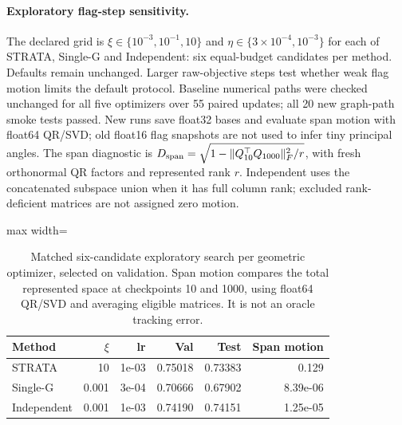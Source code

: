 \paragraph{Exploratory flag-step sensitivity.} The declared grid is $\xi\in\{10^{-3},10^{-1},10\}$ and $\eta\in\{3\times10^{-4},10^{-3}\}$ for each of STRATA, Single-G and Independent: six equal-budget candidates per method. Defaults remain unchanged. Larger raw-objective steps test whether weak flag motion limits the default protocol. Baseline numerical paths were checked unchanged for all five optimizers over 55 paired updates; all 20 new graph-path smoke tests passed. New runs save float32 bases and evaluate span motion with float64 QR/SVD; old float16 flag snapshots are not used to infer tiny principal angles. The span diagnostic is $D_{\rm span}=\sqrt{1-\lVert Q_{10}^{\top}Q_{1000}\rVert_F^2/r}$, with fresh orthonormal QR factors and represented rank $r$. Independent uses the concatenated subspace union when it has full column rank; excluded rank-deficient matrices are not assigned zero motion.
\begin{table}[htbp]\centering\footnotesize\setlength{\tabcolsep}{3pt}\caption{Matched six-candidate exploratory search per geometric optimizer, selected on validation. Span motion compares the total represented space at checkpoints 10 and 1000, using float64 QR/SVD and averaging eligible matrices. It is not an oracle tracking error.}\label{tab:xi-sweep}\begin{adjustbox}{max width=\linewidth}
\begin{tabular}{lrrrrr}\toprule Method & $\xi$ & lr & Val & Test & Span motion\\\midrule
\rowcolor{oursbg}
STRATA & 10 & 1e-03 & 0.75018 & 0.73383 & 0.129 \\
Single-G & 0.001 & 3e-04 & 0.70666 & 0.67902 & 8.39e-06 \\
Independent & 0.001 & 1e-03 & 0.74190 & 0.74151 & 1.25e-05 \\
\bottomrule\end{tabular}
\end{adjustbox}\end{table}
